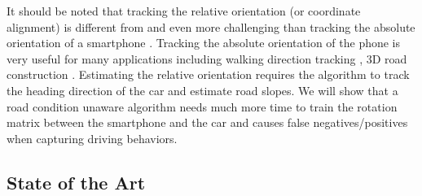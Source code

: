 It should be noted that tracking the relative orientation 
(or coordinate alignment) is different from
and even more challenging than 
tracking the absolute orientation of 
a smartphone \cite{zhou2014use}. 
Tracking the absolute orientation of the phone is very useful for
many applications including walking direction
tracking \cite{roy2014smartphone}, 
3D road construction \cite{yang2015low}.
Estimating the relative orientation requires the algorithm
to track the heading direction of the car and estimate 
road slopes.
We will show that a road condition unaware algorithm
needs much more time to train the rotation matrix
between the smartphone and the car and causes 
false negatives/positives when capturing driving behaviors.
\subsection{State of the Art}

